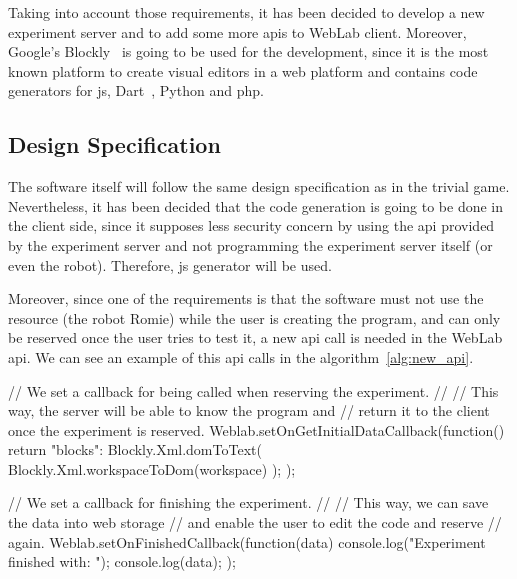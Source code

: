 Taking into account those requirements, it has been decided to develop a new experiment server and
to add some more \acrshort{api}s to WebLab client. Moreover, Google's Blockly~\cite{blockly} is
going to be used for the development, since it is the most known platform to create visual editors
in a web platform and contains code generators for \acrlong{js}, Dart~\cite{dart}, Python and
\acrshort{php}.

\subsection{Design Specification}

The software itself will follow the same design specification as in the trivial game. Nevertheless,
it has been decided that the code generation is going to be done in the client side, since it
supposes less security concern by using the \acrshort{api} provided by the experiment server and not
programming the experiment server itself (or even the robot). Therefore, \acrlong{js} generator will
be used.

Moreover, since one of the requirements is that the software must not use the resource (the robot
Romie) while the user is creating the program, and can only be reserved once the user tries to test
it, a new \acrshort{api} call is needed in the WebLab \acrshort{api}. We can see an example of this
\acrshort{api} calls in the algorithm~\ref{alg:new_api}.

\begin{center}
\begin{minipage}{.9\textwidth}
\singlespace
{}
\begin{pyglist}[language=javascript, caption={New WebLab \acrshort{api} functions.},
	label={alg:new_api}, listingname={Algorithm}, numbers=left]
// We set a callback for being called when reserving the experiment.
//
// This way, the server will be able to know the program and
// return it to the client once the experiment is reserved.
Weblab.setOnGetInitialDataCallback(function() {
    return {"blocks": Blockly.Xml.domToText(
        Blockly.Xml.workspaceToDom(workspace)
    )};
});

// We set a callback for finishing the experiment.
//
// This way, we can save the data into web storage
// and enable the user to edit the code and reserve
// again.
Weblab.setOnFinishedCallback(function(data) {
    console.log("Experiment finished with: ");
    console.log(data);
});
\end{pyglist}
\end{minipage}
\end{center}

